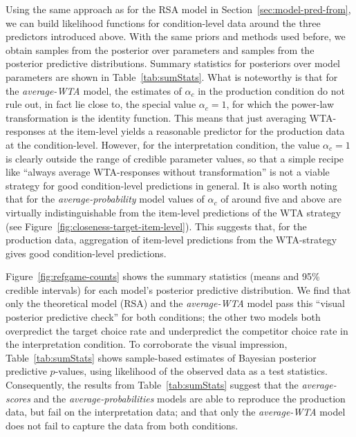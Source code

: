 \documentclass[fleqn]{article}
\begin{document}
Using the same approach as for the RSA model in Section~\ref{sec:model-pred-from}, we can build likelihood functions for condition-level data around the three predictors introduced above.
With the same priors and methods used before, we obtain samples from the posterior over parameters and samples from the posterior predictive distributions.
Summary statistics for posteriors over model parameters are shown in Table~\ref{tab:sumStats}.
What is noteworthy is that for the \emph{average-WTA} model, the estimates of $\alpha_{c}$ in the production condition do not rule out, in fact lie close to, the special value $\alpha_{c}=1$, for which the power-law transformation is the identity function.
This means that just averaging WTA-responses at the item-level yields a reasonable predictor for the production data at the condition-level.
However, for the interpretation condition, the value $\alpha_{c}=1$ is clearly outside the range of credible parameter values, so that a simple recipe like ``always average WTA-responses without transformation'' is not a viable strategy for good condition-level predictions in general.
It is also worth noting that for the \emph{average-probability} model values of $\alpha_{c}$ of around five and above are virtually indistinguishable from the item-level predictions of the WTA strategy (see Figure~\ref{fig:closeness-target-item-level}).
This suggests that, for the production data, aggregation of item-level predictions from the WTA-strategy gives good condition-level predictions.

Figure~\ref{fig:refgame-counts} shows the summary statistics (means and 95\% credible intervals) for each model's posterior predictive distribution.
We find that only the theoretical model (RSA) and the \emph{average-WTA} model pass this ``visual posterior predictive check'' for both conditions; the other two models both overpredict the target choice rate and underpredict the competitor choice rate in the interpretation condition.
To corroborate the visual impression, Table~\ref{tab:sumStats} shows sample-based estimates of Bayesian posterior predictive $p$-values, using likelihood of the observed data as a test statistics.
Consequently, the results from Table~\ref{tab:sumStats} suggest that the \emph{average-scores} and the \emph{average-probabilities} models are able to reproduce the production data, but fail on the interpretation data; and that only the \emph{average-WTA} model does not fail to capture the data from both conditions.
\end{document}

